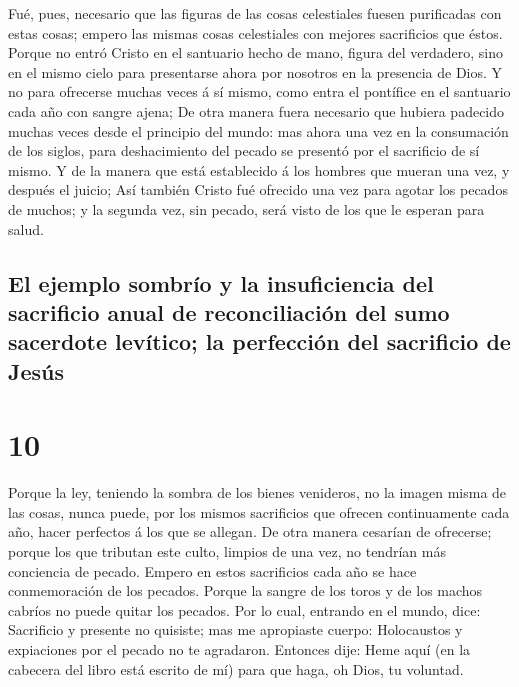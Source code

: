  Fué, pues, necesario que las figuras de las cosas
celestiales fuesen purificadas con estas cosas; empero las mismas cosas
celestiales con mejores sacrificios que éstos.  Porque no
entró Cristo en el santuario hecho de mano, figura del verdadero, sino
en el mismo cielo para presentarse ahora por nosotros en la presencia de
Dios.  Y no para ofrecerse muchas veces á sí mismo, como
entra el pontífice en el santuario cada año con sangre ajena;
 De otra manera fuera necesario que hubiera padecido
muchas veces desde el principio del mundo: mas ahora una vez en la
consumación de los siglos, para deshacimiento del pecado se presentó por
el sacrificio de sí mismo.  Y de la manera que está
establecido á los hombres que mueran una vez, y después el juicio;
 Así también Cristo fué ofrecido una vez para agotar los
pecados de muchos; y la segunda vez, sin pecado, será visto de los que
le esperan para salud.

\hypertarget{el-ejemplo-sombruxedo-y-la-insuficiencia-del-sacrificio-anual-de-reconciliaciuxf3n-del-sumo-sacerdote-levuxedtico-la-perfecciuxf3n-del-sacrificio-de-jesuxfas}{%
\subsection{El ejemplo sombrío y la insuficiencia del sacrificio anual
de reconciliación del sumo sacerdote levítico; la perfección del
sacrificio de
Jesús}\label{el-ejemplo-sombruxedo-y-la-insuficiencia-del-sacrificio-anual-de-reconciliaciuxf3n-del-sumo-sacerdote-levuxedtico-la-perfecciuxf3n-del-sacrificio-de-jesuxfas}}

\hypertarget{section-58-10}{%
\section{10}\label{section-58-10}}

 Porque la ley, teniendo la sombra de los bienes
venideros, no la imagen misma de las cosas, nunca puede, por los mismos
sacrificios que ofrecen continuamente cada año, hacer perfectos á los
que se allegan.  De otra manera cesarían de ofrecerse;
porque los que tributan este culto, limpios de una vez, no tendrían más
conciencia de pecado.  Empero en estos sacrificios cada
año se hace conmemoración de los pecados.  Porque la
sangre de los toros y de los machos cabríos no puede quitar los pecados.
 Por lo cual, entrando en el mundo, dice: Sacrificio y
presente no quisiste; mas me apropiaste cuerpo: 
Holocaustos y expiaciones por el pecado no te agradaron. 
Entonces dije: Heme aquí (en la cabecera del libro está escrito de mí)
para que haga, oh Dios, tu voluntad.

